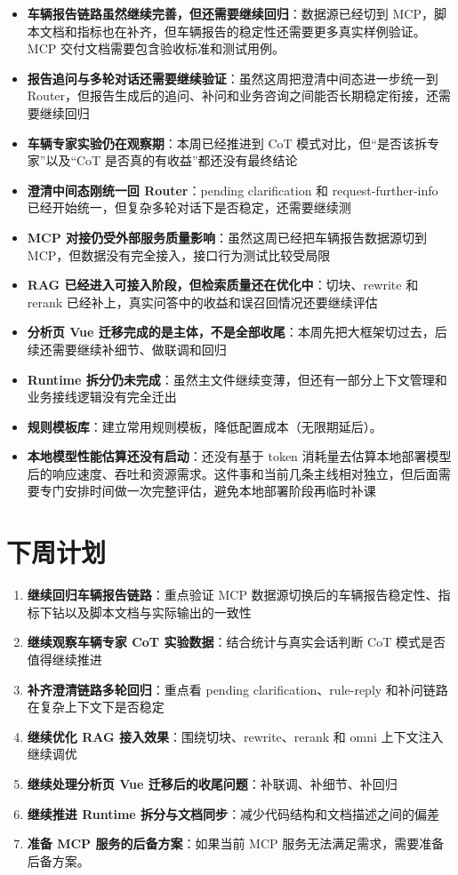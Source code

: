 \documentclass[UTF8]{ctexart}
\begin{document}
\begin{itemize}
\item \textbf{车辆报告链路虽然继续完善，但还需要继续回归}：数据源已经切到 MCP，脚本文档和指标也在补齐，但车辆报告的稳定性还需要更多真实样例验证。MCP 交付文档需要包含验收标准和测试用例。
\item \textbf{报告追问与多轮对话还需要继续验证}：虽然这周把澄清中间态进一步统一到 Router，但报告生成后的追问、补问和业务咨询之间能否长期稳定衔接，还需要继续回归
\item \textbf{车辆专家实验仍在观察期}：本周已经推进到 CoT 模式对比，但“是否该拆专家”以及“CoT 是否真的有收益”都还没有最终结论
\item \textbf{澄清中间态刚统一回 Router}：pending clarification 和 request-further-info 已经开始统一，但复杂多轮对话下是否稳定，还需要继续测
\item \textbf{MCP 对接仍受外部服务质量影响}：虽然这周已经把车辆报告数据源切到 MCP，但数据没有完全接入，接口行为测试比较受局限
\item \textbf{RAG 已经进入可接入阶段，但检索质量还在优化中}：切块、rewrite 和 rerank 已经补上，真实问答中的收益和误召回情况还要继续评估
\item \textbf{分析页 Vue 迁移完成的是主体，不是全部收尾}：本周先把大框架切过去，后续还需要继续补细节、做联调和回归
\item \textbf{Runtime 拆分仍未完成}：虽然主文件继续变薄，但还有一部分上下文管理和业务接线逻辑没有完全迁出
\item \textbf{规则模板库}：建立常用规则模板，降低配置成本（无限期延后）。
\item \textbf{本地模型性能估算还没有启动}：还没有基于 token 消耗量去估算本地部署模型后的响应速度、吞吐和资源需求。这件事和当前几条主线相对独立，但后面需要专门安排时间做一次完整评估，避免本地部署阶段再临时补课
\end{itemize}

\section{下周计划}

\begin{enumerate}
\item \textbf{继续回归车辆报告链路}：重点验证 MCP 数据源切换后的车辆报告稳定性、指标下钻以及脚本文档与实际输出的一致性
\item \textbf{继续观察车辆专家 CoT 实验数据}：结合统计与真实会话判断 CoT 模式是否值得继续推进
\item \textbf{补齐澄清链路多轮回归}：重点看 pending clarification、rule-reply 和补问链路在复杂上下文下是否稳定
\item \textbf{继续优化 RAG 接入效果}：围绕切块、rewrite、rerank 和 omni 上下文注入继续调优
\item \textbf{继续处理分析页 Vue 迁移后的收尾问题}：补联调、补细节、补回归
\item \textbf{继续推进 Runtime 拆分与文档同步}：减少代码结构和文档描述之间的偏差
\item \textbf{准备 MCP 服务的后备方案}：如果当前 MCP 服务无法满足需求，需要准备后备方案。
\end{enumerate}
\end{document}
